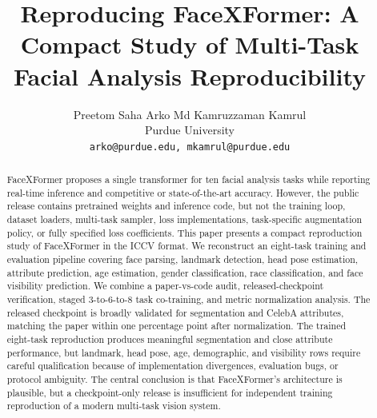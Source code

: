 \documentclass[10pt,twocolumn,letterpaper]{article}
\title{Reproducing FaceXFormer: A Compact Study of Multi-Task Facial Analysis Reproducibility}
\author{Preetom Saha Arko \quad Md Kamruzzaman Kamrul\\
Purdue University\\
{\tt\small arko@purdue.edu, mkamrul@purdue.edu}
}
\begin{document}
\maketitle

\begin{abstract}
FaceXFormer proposes a single transformer for ten facial analysis tasks while reporting real-time inference and competitive or state-of-the-art accuracy. However, the public release contains pretrained weights and inference code, but not the training loop, dataset loaders, multi-task sampler, loss implementations, task-specific augmentation policy, or fully specified loss coefficients. This paper presents a compact reproduction study of FaceXFormer in the ICCV format. We reconstruct an eight-task training and evaluation pipeline covering face parsing, landmark detection, head pose estimation, attribute prediction, age estimation, gender classification, race classification, and face visibility prediction. We combine a paper-vs-code audit, released-checkpoint verification, staged 3-to-6-to-8 task co-training, and metric normalization analysis. The released checkpoint is broadly validated for segmentation and CelebA attributes, matching the paper within one percentage point after normalization. The trained eight-task reproduction produces meaningful segmentation and close attribute performance, but landmark, head pose, age, demographic, and visibility rows require careful qualification because of implementation divergences, evaluation bugs, or protocol ambiguity. The central conclusion is that FaceXFormer's architecture is plausible, but a checkpoint-only release is insufficient for independent training reproduction of a modern multi-task vision system.
\end{abstract}



{
    \small
    
    
}
\end{document}
